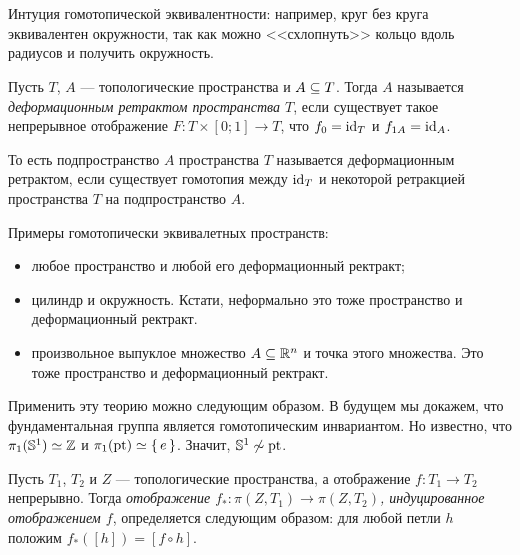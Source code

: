 \documentclass[main]{subfiles}
\begin{document}
\resetcounters

\section{}

Интуция гомотопической эквивалентности: например, круг без круга эквивалентен окружности, так как можно
<<схлопнуть>> кольцо вдоль радиусов и получить окружность.

\begin{definition}
	Пусть $ T $, $ A $ --- топологические пространства и $ A \subseteq T $. Тогда $ A $ называется \emph{деформационным
	ретрактом пространства $ T $}, если существует такое непрерывное отображение $ F \colon T \times [0; 1] \to T $,
	что $ f_0 = \operatorname{id}_T $ и $ f_{1 A} = \operatorname{id}_A $.
\end{definition}

\begin{remark}
	То есть подпространство $ A $ пространства $ T $ называется деформационным ретрактом, если существует гомотопия
	между $ \operatorname{id}_T $ и некоторой ретракцией пространства $ T $ на подпространство $ A $.
\end{remark}

\begin{example} Примеры гомотопически эквивалетных пространств:
	\begin{itemize}
		\item любое пространство и любой его деформационный ректракт;
		\item цилиндр и окружность. Кстати, неформально это тоже пространство и деформационный ректракт.
		\item произвольное выпуклое множество $ A \subseteq \mathbb{R}^n $ и точка этого множества. Это тоже пространство и
			деформационный ректракт.
	\end{itemize}
\end{example}

\begin{example}
	Применить эту теорию можно следующим образом. В будущем мы докажем, что фундаментальная группа является
	гомотопическим инвариантом. Но известно, что $ \pi_1(\mathbb{S}^1) \simeq \mathbb{Z} $ и $ \pi_1(\operatorname{pt}) \simeq \left\{\,e\,\right\} $.
	Значит, $ \mathbb{S}^1 \not \sim \operatorname{pt} $.
\end{example}

\begin{definition}
	Пусть $ T_1 $, $ T_2 $ и $ Z $ --- топологические пространства, а отображение $ f \colon T_1 \to T_2 $ непрерывно.
	Тогда \emph{отображение $ f_* \colon \pi(Z, T_1) \to \pi(Z, T_2) $, индуцированное отображением $ f $},
	определяется следующим образом: для любой петли $ h $ положим $ f_*([h]) = [f \circ h] $.
\end{definition}
\end{document}
